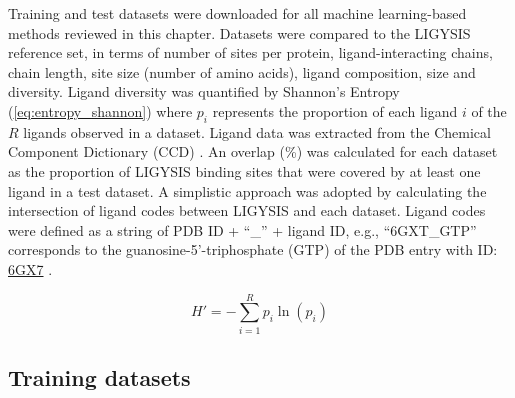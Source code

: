 Training and test datasets were downloaded for all machine learning-based methods reviewed in this chapter. Datasets were compared to the LIGYSIS reference set, in terms of number of sites per protein, ligand-interacting chains, chain length, site size (number of amino acids), ligand composition, size and diversity. Ligand diversity was quantified by Shannon's Entropy \cite{SHANNON_1948_ENTROPY} (\autoref{eq:entropy_shannon}) where $p_i$ represents the proportion of each ligand $i$ of the $R$ ligands observed in a dataset. Ligand data was extracted from the Chemical Component Dictionary (CCD) \cite{WESTBROOK_2015_CCD}. An overlap (\%) was calculated for each dataset as the proportion of LIGYSIS binding sites that were covered by at least one ligand in a test dataset. A simplistic approach was adopted by calculating the intersection of ligand codes between LIGYSIS and each dataset. Ligand codes were defined as a string of PDB ID + ``\_'' + ligand ID, e.g., ``6GXT\_GTP'' corresponds to the guanosine-5’-triphosphate (GTP) of the PDB entry with ID: \href{https://www.ebi.ac.uk/pdbe/entry/pdb/6gx7}{6GX7} \cite{CAMPANACCI_2019_TUBULIN}.

\begin{equation}
H' = - \sum_{i=1}^{R} p_i \ln(p_i)
\label{eq:entropy_shannon}
\end{equation}

\subsection{Training datasets}

